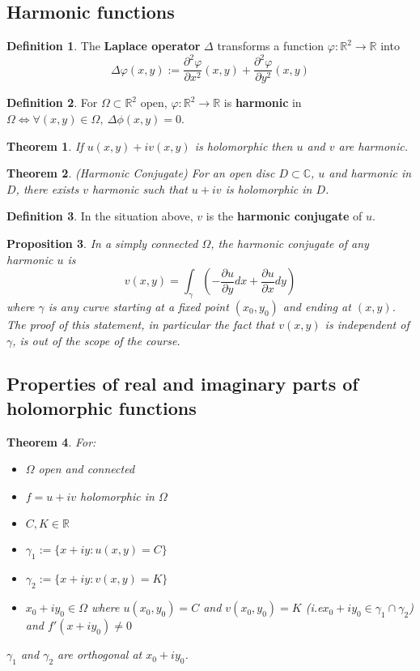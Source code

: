 \documentclass[12pt]{article}
\newtheorem{thm}{Theorem}[section]
\newtheorem{prop}[thm]{Proposition}
\theoremstyle{definition}
\newtheorem{defn}{Definition}[section]
\newcommand{\C}{\mathbb{C}}
\newcommand{\R}{\mathbb{R}}
\begin{document}
\subsection{Harmonic functions}

\begin{defn}
  The \textbf{Laplace operator} $\Delta$ transforms a function $\varphi : \R^2 \to \R$ into
  $$\Delta\varphi(x, y) := \frac{\partial^2\varphi}{\partial x^2}(x, y) + \frac{\partial^2\varphi}{\partial y^2}(x, y)$$
\end{defn}

\begin{defn}
  For $\Omega \subset \R^2$ open, $\varphi : \R^2 \to \R$ is \textbf{harmonic} in $\Omega \iff \forall (x, y) \in \Omega,\ \Delta\phi(x, y) = 0$.
\end{defn}

\begin{thm}
  If $u(x, y) + iv(x, y)$ is holomorphic then $u$ and $v$ are harmonic.
\end{thm}

\begin{thm}
  (Harmonic Conjugate)
  For an open disc $D \subset \C$, $u$ and harmonic in $D$, there exists $v$ harmonic such that $u + iv$ is holomorphic in $D$.
\end{thm}

\begin{defn}
  In the situation above, $v$ is the \textbf{harmonic conjugate} of $u$.
\end{defn}

\begin{prop}
  In a simply connected $\Omega$, the harmonic conjugate of any harmonic $u$ is
  $$v(x, y) = \int_{\gamma}\left(-\frac{\partial u}{\partial y}dx + \frac{\partial u}{\partial x}dy\right)$$
  where $\gamma$ is any curve starting at a fixed point $(x_0, y_0)$ and ending at $(x, y)$.
  The proof of this statement, in particular the fact that $v(x, y)$ is independent of $\gamma$, is out of the scope of the course.
\end{prop}

\subsection{Properties of real and imaginary parts of holomorphic functions}

\begin{thm}
  For:
  \begin{itemize}
    \item $\Omega$ open and connected
    \item $f = u + iv$ holomorphic in $\Omega$
    \item $C, K \in \R$
    \item $\gamma_1 := \{x + iy : u(x, y) = C\}$
    \item $\gamma_2 := \{x + iy : v(x, y) = K\}$
    \item $x_0 + iy_0 \in \Omega$ where $u(x_0, y_0) = C$ and $v(x_0, y_0) = K$ (i.e\@ $x_0 + iy_0 \in \gamma_1 \cap \gamma_2$) and $f'(x + iy_0) \neq 0$
  \end{itemize}
  $\gamma_1$ and $\gamma_2$ are orthogonal at $x_0 + iy_0$.
\end{thm}
\end{document}
